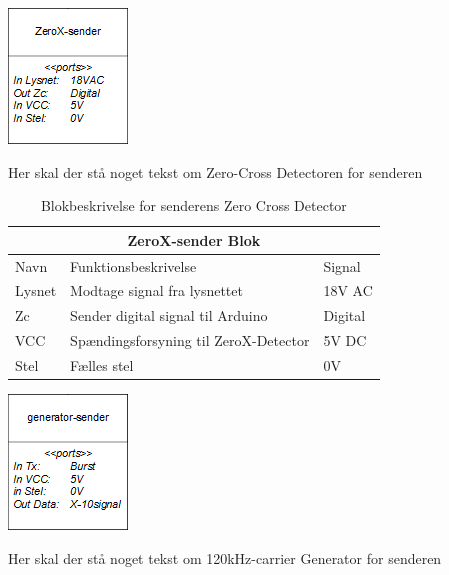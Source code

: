\documentclass[11pt]{article}
\begin{document}
\begin{minipage}[Ht]{0.45\linewidth}
	\centering
	\includegraphics{ZeroX-sender-blok.png}
\end{minipage}
\hfill
\begin{minipage}[!t]{0.45\linewidth}
	\centering
   Her skal der stå noget tekst om Zero-Cross Detectoren for senderen
\end{minipage}%
\hfill

\begin{table}[H]
\centering
	\begin{tabular}{l|l|l}
	
	\toprule[0.4mm]\midrule \multicolumn{3}{c}{\textbf{ZeroX-sender Blok}}\\
	\midrule[0.4mm] Navn & Funktionsbeskrivelse & Signal\\ \midrule[0.3mm]
	 Lysnet & Modtage signal fra lysnettet & 18V AC\\
	 Zc & Sender digital signal til Arduino & Digital\\
	 VCC & Spændingsforsyning til ZeroX-Detector & 5V DC\\
	 Stel & Fælles stel  & 0V\\
	 \midrule\bottomrule[0.4mm]

	\end{tabular}
	\caption{Blokbeskrivelse for senderens Zero Cross Detector}
	\label{tab: Bloktabel ZeroX sender}
\end{table}
\qquad


\begin{minipage}[Ht]{0.45\linewidth}
	\centering
	\includegraphics{Generator-sender-blok.png}
\end{minipage}
\hfill
\begin{minipage}[!t]{0.45\linewidth}
	\centering
   Her skal der stå noget tekst om 120kHz-carrier Generator for senderen
\end{minipage}%
\hfill
\end{document}
